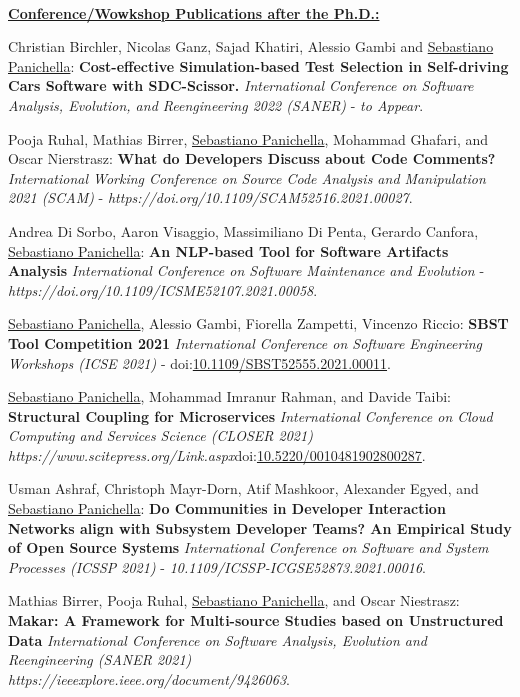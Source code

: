 \documentclass[10pt]{article}
\newcommand\doilink[1]{\href{http://dx.doi.org/#1}{#1}}
\newcommand\doi[1]{doi:\doilink{#1}}
\begin{document}
\textbf{\\\underline{Conference/Wowkshop Publications after the Ph.D.:}}\\
\begin{bibenum}
  		\item \label{Cm24} Christian Birchler, Nicolas Ganz, Sajad Khatiri, Alessio Gambi and \underline{Sebastiano Panichella}:  \textbf{Cost-effective Simulation-based Test Selection in Self-driving Cars Software with SDC-Scissor.}  \emph{International Conference on Software Analysis, Evolution, and Reengineering 2022 (SANER)} - \textit{to Appear}. 
  		\item \label{Cm23} Pooja Ruhal, Mathias Birrer, \underline{Sebastiano Panichella}, Mohammad Ghafari, and Oscar Nierstrasz:  \textbf{What do Developers Discuss about Code Comments?}  \emph{International Working Conference on Source Code Analysis and Manipulation 2021 (SCAM)} - \textit{https://doi.org/10.1109/SCAM52516.2021.00027}.
 		\item \label{Cm22} Andrea Di Sorbo, Aaron Visaggio, Massimiliano Di Penta, Gerardo Canfora, \underline{Sebastiano Panichella}:  \textbf{An NLP-based Tool for Software Artifacts Analysis}  \emph{International Conference on Software Maintenance and Evolution} - \textit{https://doi.org/10.1109/ICSME52107.2021.00058}.
 		\item \label{Cm21} \underline{Sebastiano Panichella}, Alessio Gambi, Fiorella Zampetti, Vincenzo Riccio:  \textbf{SBST Tool Competition 2021}  \emph{International Conference on Software Engineering Workshops (ICSE 2021)} - \doi{10.1109/SBST52555.2021.00011}. 
       \item \label{Cm20} \underline{Sebastiano Panichella}, Mohammad Imranur Rahman, and Davide Taibi:  \textbf{Structural Coupling for Microservices}  \emph{International Conference on Cloud Computing and Services Science (CLOSER 2021)}\\ \textit{https://www.scitepress.org/Link.aspx}\doi{10.5220/0010481902800287}. 
       \item \label{Cm19} Usman Ashraf, Christoph Mayr-Dorn, Atif Mashkoor, Alexander Egyed, and \underline{Sebastiano Panichella}:  \textbf{Do Communities in Developer Interaction Networks align with Subsystem Developer Teams? An Empirical Study of Open Source Systems}  \emph{International Conference on Software and System Processes (ICSSP 2021)} - \textit{10.1109/ICSSP-ICGSE52873.2021.00016}.   
      \item \label{Cm17_2} Mathias Birrer, Pooja Ruhal, \underline{Sebastiano Panichella}, and Oscar Niestrasz:  \textbf{Makar: A Framework for Multi-source Studies based on Unstructured Data}  \emph{International Conference on Software Analysis, Evolution and Reengineering (SANER 2021)}\\ \textit{https://ieeexplore.ieee.org/document/9426063}.   

\end{bibenum}
\end{document}

